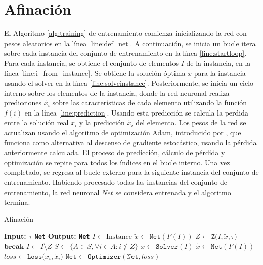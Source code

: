 \documentclass[spanish, a4paper, 12pt, openany,final]{book}
\begin{document}
\section{Afinación}

El Algoritmo \ref{alg:training} de entrenamiento comienza inicializando la red con pesos aleatorios en la línea \ref{line:def_net}. A continuación, se inicia un bucle itera sobre cada instancia del conjunto de entrenamiento en la línea \ref{line:startloop}. Para cada instancia, se obtiene el conjunto de elementos $I$ de la instancia, en la línea \ref{line:i_from_instance}. Se obtiene la solución óptima $x$ para la instancia usando el solver en la línea \ref{line:solveinstance}. Posteriormente, se inicia un ciclo interno sobre los elementos de la instancia, donde la red neuronal realiza predicciones $\tilde{x_i}$ sobre las características de cada elemento utilizando la función \(f(i)\) en la línea \ref{line:prediction}.
Usando esta predicción se calcula la perdida entre la solución real $x_i$ y la predicción $\tilde{x}_i$ del elemento. Los pesos de la red se actualizan usando el algoritmo de optimización Adam, introducido por \cite{kingma2017adam}, que funciona como alternativa al descenso de gradiente estocástico, usando la pérdida anteriormente calculada. El proceso de predicción, cálculo de pérdida y optimización se repite para todos los índices en el bucle interno. Una vez completado, se regresa al bucle externo para la siguiente instancia del conjunto de entrenamiento. Habiendo procesado todas las instancias del conjunto de entrenamiento, la red neuronal $Net$ se considera entrenada y el algoritmo termina.

\begin{algorithm}[H]
	\caption{Afinación}\label{alg:tunning}
	\begin{algorithmic}[1]
		\Statex \textbf{Input: $\tau$ \texttt{Net}}
		\Statex \textbf{Output: \texttt{Net}}
				\State $I \gets \text{Instance}$ \label{line:def_I}
				\Loop
					\State $\tilde{x} \gets \texttt{Net}(F(I))$   \label{line:alg2:initial_pred}
					\State $Z \gets \texttt{Z($I,\tilde{x},\tau$)}$ \label{start_reduction_alg}
						\State $\textbf{break}$ 
					\EndIf
					\State $I \gets I\setminus Z$ \label{alg1:update_I_2}
					\State $S \gets \{A \in S, \forall i \in A: i \notin Z\}$  \label{end_reduction_alg}
				\State $x \gets \texttt{Solver}(I)$   \label{solve_smaller}
				\State $\tilde{x} \gets \texttt{Net}(F(I))$  \label{pred_smaller}
				\State $loss \gets \texttt{Loss($x_i,\tilde{x_i})$}$ \label{smaller_loss}
				\State $\texttt{Net} \gets \texttt{Optimizer}(\texttt{Net},loss)$	  \label{smaller_optim}
			\EndFor
			\EndLoop
		\EndFor
	\end{algorithmic}
\end{algorithm}
\end{document}
